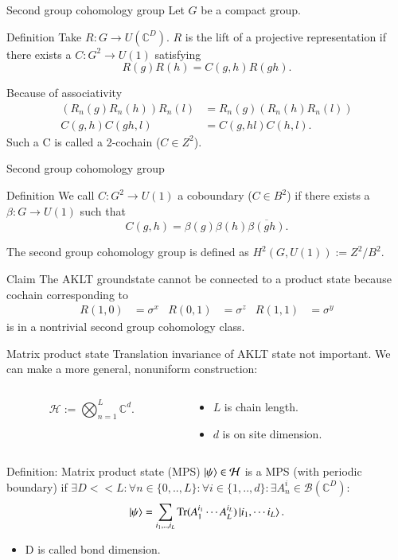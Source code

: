 \documentclass{beamer}
\newcommand{\HH}{\mathcal{H}}
\newcommand{\CC}{\mathbb{C}}
\newcommand{\BB}{\mathcal{B}}
\newcommand{\Tr}{\mathrm{Tr}}
\begin{document}
\begin{frame}{Second group cohomology group}
Let $G$ be a compact group.
\begin{block}{Definition}
Take $R:G\rightarrow U(\CC^D)$. $R$ is the lift of a projective representation if there exists a $C:G^2\rightarrow U(1)$ satisfying
\[R(g)R(h)=C(g,h)R(gh).\]
\end{block}
\pause
Because of associativity
\begin{align*}
(R_n(g)R_n(h))R_n(l)&=R_n(g)(R_n(h)R_n(l))\\
C(g,h)C(gh,l)&=C(g,hl)C(h,l).
\end{align*}
Such a C is called a 2-cochain ($C\in Z^2$).
\end{frame}

\begin{frame}{Second group cohomology group}
\begin{block}{Definition}
We call $C:G^2\rightarrow U(1)$ a coboundary ($C\in B^2$) if there exists a $\beta:G\rightarrow U(1)$ such that
\[C(g,h)=\beta(g)\beta(h)\overline{\beta(gh)}.\]
\end{block}
The second group cohomology group is defined as $H^2(G,U(1)):=Z^2/B^2$.
\pause
\begin{block}{Claim}
The AKLT groundstate cannot be connected to a product state because cochain corresponding to
\begin{align*}
R(1,0)&=\sigma^x&R(0,1)&=\sigma^z&R(1,1)&=\sigma^y
\end{align*}
is in a nontrivial second group cohomology class.
\end{block}
\end{frame}

\begin{frame}{Matrix product state}
Translation invariance of AKLT state not important. We can make a more general, nonuniform construction:
\begin{columns}
\begin{column}{0.5\textwidth}
\[\HH := \bigotimes_{n=1}^{L}\CC^{d}.\]
\end{column}
\begin{column}{0.5\textwidth}
\begin{itemize}
\item $L$ is chain length.
\item $d$ is on site dimension.
\end{itemize}
\end{column}
\end{columns}
\pause
\begin{block}{Definition: Matrix product state (MPS)}
$\ket{\psi}\in\HH$ is a MPS (with periodic boundary) if $\exists D<<L:\forall n\in\{0,..,L\}:\forall i\in\{1,..,d\}:\exists A^i_n\in\BB(\CC^D):$
\begin{equation}
\ket{\psi}=\sum_{i_1,..,i_L}\Tr(A^{i_1}_1\cdots A^{i_L}_L)\ket{i_1,\cdots i_L}.
\end{equation}
\end{block}
\pause
\begin{itemize}
\item D is called bond dimension.
\end{itemize}
\end{frame}
\end{document}
